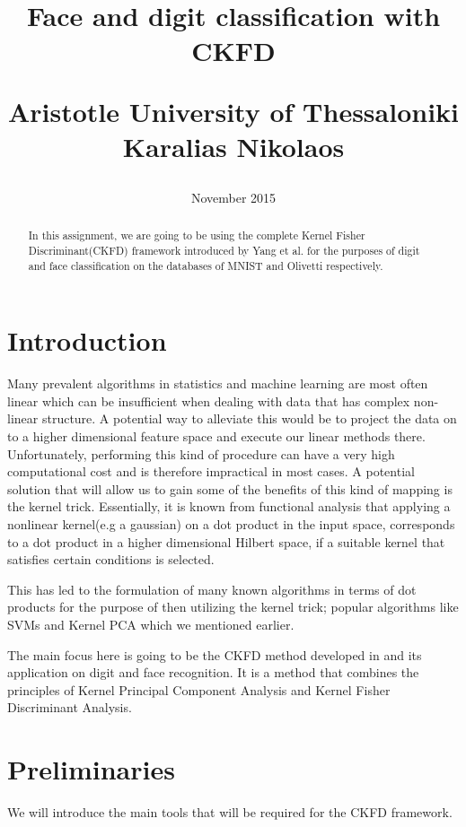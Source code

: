 \documentclass[7 pt]{article}
\title{ {\huge Face and digit classification with CKFD} \\
\begin{center}
\end{center}
{Aristotle University of Thessaloniki} \\
\vspace{10mm}
{\Large Karalias Nikolaos}
}
\date{November 2015}
\begin{document}
\maketitle


\begin{abstract}
In this assignment, we are going to be using the complete Kernel Fisher Discriminant(CKFD) framework introduced by Yang et al. for the purposes of digit and face classification on the databases of MNIST and Olivetti respectively.

\end{abstract}

\bigskip \bigskip
\begin{multicols}{2}
\section{Introduction} \bigskip
Many prevalent algorithms  in statistics and machine learning are most often linear which can be insufficient when dealing with data that has complex non-linear structure. A potential way to alleviate this would be to project the data on to a higher dimensional feature space and execute our linear methods there. Unfortunately, performing this kind of procedure can have a very high computational cost and is therefore impractical in most cases. A potential solution that will allow us to gain some of the benefits of this kind of mapping is the kernel trick. Essentially, it is known from functional analysis that applying a nonlinear kernel(e.g a gaussian) on a dot product in the input space, corresponds to a dot product in a higher dimensional Hilbert space, if a suitable kernel that satisfies certain conditions is selected.\cite{smola06}
 
 This has led to the formulation of many known algorithms in terms of dot products for the purpose of then utilizing the kernel trick; popular algorithms like SVMs and Kernel PCA  which we mentioned earlier. \cite{hof06}
 

The main focus here is going to be the CKFD method developed in  \cite{yang05} and its application
on digit and face recognition. It is a method that combines the principles of Kernel Principal Component Analysis\cite{schol98} and Kernel Fisher Discriminant Analysis\cite{schol99}.

\section{Preliminaries}
We will introduce the main tools that will be required for the CKFD framework.

\end{multicols}
\end{document}

